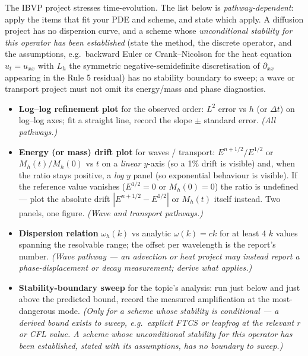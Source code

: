 \documentclass[11pt]{article}
\begin{document}
The IBVP project stresses time-evolution. The list below is
\emph{pathway-dependent}: apply the items that fit your PDE and scheme,
and state which apply. A diffusion project has no dispersion curve, and
a scheme whose \emph{unconditional stability for this operator has been
established} (state the method, the discrete operator, and the
assumptions, e.g.\ backward Euler or Crank--Nicolson for the heat
equation $u_t = u_{xx}$ with $L_h$ the symmetric negative-semidefinite
discretisation of $\partial_{xx}$ appearing in the Rule 5 residual) has
no stability boundary to sweep; a wave or transport project must not
omit its energy/mass and phase diagnostics.

\begin{itemize}[leftmargin=2em, itemsep=1pt]
  \item\textbf{Log--log refinement plot} for the observed order:
        $L^2$ error vs $h$ (or $\Delta t$) on log--log axes; fit a
        straight line, record the slope $\pm$ standard error.
        \emph{(All pathways.)}
  \item\textbf{Energy (or mass) drift plot} for waves / transport:
        $E^{n+1/2}/E^{1/2}$ or $M_h(t)/M_h(0)$ vs $t$ on a \emph{linear}
        $y$-axis (so a 1\% drift is visible) and, when the ratio stays
        positive, a \emph{log} $y$ panel (so exponential behaviour is
        visible). If the reference value vanishes ($E^{1/2}=0$ or
        $M_h(0)=0$) the ratio is undefined --- plot the absolute drift
        $|E^{n+1/2}-E^{1/2}|$ or $M_h(t)$ itself instead. Two panels, one
        figure. \emph{(Wave and transport pathways.)}
  \item\textbf{Dispersion relation} $\omega_h(k)$ vs analytic
        $\omega(k)=ck$ for at least 4 $k$ values spanning the resolvable
        range; the offset per wavelength is the report's number.
        \emph{(Wave pathway --- an advection or heat project may instead
        report a phase-displacement or decay measurement; derive what
        applies.)}
  \item\textbf{Stability-boundary sweep} for the topic's analysis:
        run just below and just above the predicted bound, record the
        measured amplification at the most-dangerous mode.
        \emph{(Only for a scheme whose stability is conditional --- a
        derived bound exists to sweep, e.g.\ explicit FTCS or leapfrog at
        the relevant $r$ or CFL value. A scheme whose unconditional
        stability for this operator has been established, stated with its
        assumptions, has no boundary to sweep.)}
\end{itemize}
\end{document}

